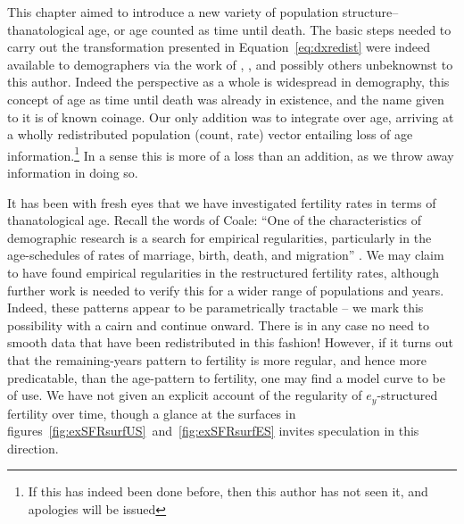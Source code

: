 \FloatBarrier

This chapter aimed to introduce a new variety of population structure--
thanatological age, or age counted as time until death. The basic steps needed
to carry out the transformation presented in Equation~\ref{eq:dxredist} were
indeed available to demographers via the work of
\citet{miller2001increasing}, \citet{lee2002approach}, \citet{vaupel2009life}
and possibly others unbeknownst to this author. Indeed the perspective as a
whole is widespread in demography, this concept of age as time until death
was already in existence, and the name given to it is of known coinage. Our only
addition was to integrate over age, arriving at a wholly 
redistributed population (count, rate) vector entailing loss of age
information.\footnote{If this has indeed been done before, then this author has
not seen it, and apologies will be issued} In a sense this is more of a loss than an addition,
as we throw away information in doing so. 

It has been with fresh eyes that we have investigated fertility rates in terms
of thanatological age. Recall the words of Coale:
``One of the characteristics of demographic research is a search for empirical regularities, particularly in the
age-schedules of rates of marriage, birth, death, and
migration'' \citep{coale1996development}. We may claim to have found
empirical regularities in the restructured fertility rates, although further
work is needed to verify this for a wider range of populations and years.
Indeed, these patterns appear to be parametrically tractable -- we mark this 
possibility with a cairn and continue onward. There is in any case no need to smooth data that
have been redistributed in this fashion! However, if it turns out that the
remaining-years pattern to fertility is more regular, and hence more
predicatable, than the age-pattern to fertility, one may find a model curve to
be of use. We have not given an explicit account of the regularity of
$e_y$-structured fertility over time, though a glance at the surfaces in
figures~\ref{fig:exSFRsurfUS}~and~\ref{fig:exSFRsurfES} invites speculation in
this direction.

